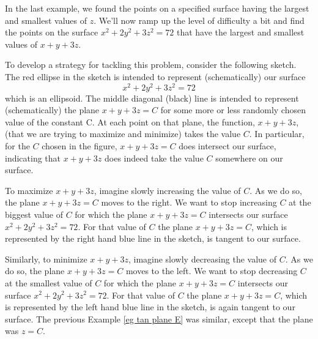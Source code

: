 \begin{eg}\label{eg tan plane F}
In the last example, we found the points on a specified surface 
having the largest and smallest values of $z$. We'll now ramp up the
level of difficulty a bit and find the points on the surface
$x^2+ 2y^2 +3z^2 = 72$ that have the largest and smallest values of 
$x+y+3z$.

To develop a strategy for tackling this problem, consider the
following sketch.
The red ellipse in the sketch is intended to represent (schematically)
our surface 
\begin{equation*}
x^2+ 2y^2 +3z^2 = 72
\end{equation*} 
which is an ellipsoid. The middle 
diagonal (black) line is intended to represent (schematically) 
the plane $x+y+3z=C$ for some more or less randomly chosen value of 
the constant C. 
At each point on that plane, the function, $x+y+3z$, (that we are trying
to maximize and minimize) takes the value $C$. 
In particular, for the $C$ chosen in the figure, $x+y+3z=C$ does intersect
our surface, indicating that $x+y+3z$ does indeed take the value $C$
somewhere on our surface. 

To maximize $x+y+3z$, imagine slowly increasing the value of $C$.
As we do so, the plane $x+y+3z=C$ moves to the right. We want to stop
increasing $C$ at the biggest value of $C$ for which the plane $x+y+3z=C$
intersects our surface $x^2+ 2y^2 +3z^2 = 72$. For that value of $C$
the plane $x+y+3z=C$, which is represented by the right hand blue line 
in the sketch, is tangent to our surface. 

Similarly, to minimize $x+y+3z$, imagine slowly decreasing the value of $C$.
As we do so, the plane $x+y+3z=C$ moves to the left. We want to stop
decreasing $C$ at the smallest value of $C$ for which the plane $x+y+3z=C$
intersects our surface $x^2+ 2y^2 +3z^2 = 72$. For that value of $C$
the plane $x+y+3z=C$, which is represented by the left hand blue line 
in the sketch, is again tangent to our surface. The previous
Example \ref{eg tan plane E} was similar, except that the plane was
$z=C$.


\end{eg}
